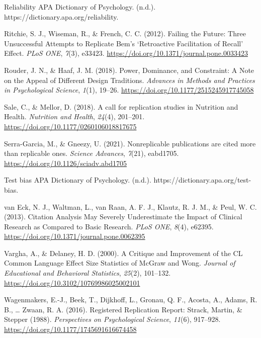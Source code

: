 \documentclass[
  english,
  jou,floatsintext]{apa6}
\newlength{\cslhangindent}
\newlength{\cslentryspacingunit} %
\newenvironment{CSLReferences}[2] %
 {%
  \setlength{\parindent}{0pt}
  \ifodd #1
  \let\oldpar\par
  \def\par{\hangindent=\cslhangindent\oldpar}
  \fi
  \setlength{\parskip}{#2\cslentryspacingunit}
 }%
 {}
\begin{document}
\begin{CSLReferences}{1}{0}
\leavevmode{}%
Reliability \textendash{} {APA Dictionary} of {Psychology}. (n.d.). https://dictionary.apa.org/reliability.

\leavevmode{}%
Ritchie, S. J., Wiseman, R., \& French, C. C. (2012). Failing the {Future}: {Three Unsuccessful Attempts} to {Replicate Bem}'s {`{Retroactive Facilitation} of {Recall}'} {Effect}. \emph{PLoS ONE}, \emph{7}(3), e33423. \url{https://doi.org/10.1371/journal.pone.0033423}

\leavevmode{}%
Rouder, J. N., \& Haaf, J. M. (2018). Power, {Dominance}, and {Constraint}: {A Note} on the {Appeal} of {Different Design Traditions}. \emph{Advances in Methods and Practices in Psychological Science}, \emph{1}(1), 19--26. \url{https://doi.org/10.1177/2515245917745058}

\leavevmode{}%
Sale, C., \& Mellor, D. (2018). A call for replication studies in {Nutrition} and {Health}. \emph{Nutrition and Health}, \emph{24}(4), 201--201. \url{https://doi.org/10.1177/0260106018817675}

\leavevmode{}%
Serra-Garcia, M., \& Gneezy, U. (2021). Nonreplicable publications are cited more than replicable ones. \emph{Science Advances}, \emph{7}(21), eabd1705. \url{https://doi.org/10.1126/sciadv.abd1705}

\leavevmode{}%
Test bias \textendash{} {APA Dictionary} of {Psychology}. (n.d.). https://dictionary.apa.org/test-bias.

\leavevmode{}%
van Eck, N. J., Waltman, L., van Raan, A. F. J., Klautz, R. J. M., \& Peul, W. C. (2013). Citation {Analysis May Severely Underestimate} the {Impact} of {Clinical Research} as {Compared} to {Basic Research}. \emph{PLoS ONE}, \emph{8}(4), e62395. \url{https://doi.org/10.1371/journal.pone.0062395}

\leavevmode{}%
Vargha, A., \& Delaney, H. D. (2000). A {Critique} and {Improvement} of the {CL Common Language Effect Size Statistics} of {McGraw} and {Wong}. \emph{Journal of Educational and Behavioral Statistics}, \emph{25}(2), 101--132. \url{https://doi.org/10.3102/10769986025002101}

\leavevmode{}%
Wagenmakers, E.-J., Beek, T., Dijkhoff, L., Gronau, Q. F., Acosta, A., Adams, R. B., \ldots{} Zwaan, R. A. (2016). Registered {Replication Report}: {Strack}, {Martin}, \& {Stepper} (1988). \emph{Perspectives on Psychological Science}, \emph{11}(6), 917--928. \url{https://doi.org/10.1177/1745691616674458}


\end{CSLReferences}
\end{document}
